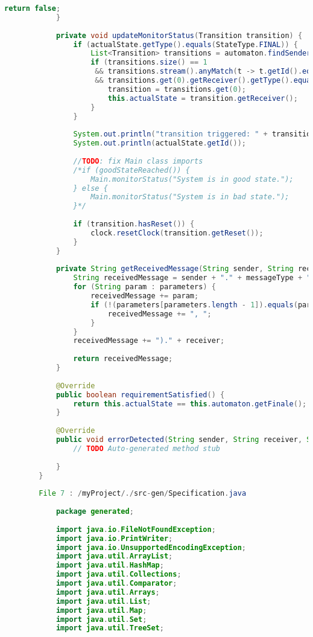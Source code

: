 \begin{lstlisting}[language=java, caption={példa unit teszteset.},captionpos=b]
				return false;
			}
			
			private void updateMonitorStatus(Transition transition) {
				if (actualState.getType().equals(StateType.FINAL)) {
					List<Transition> transitions = automaton.findSender(this.actualState);
					if (transitions.size() == 1 
					 && transitions.stream().anyMatch(t -> t.getId().equals("epsilon"))
					 && transitions.get(0).getReceiver().getType().equals(StateType.FINAL)) {
						transition = transitions.get(0);
						this.actualState = transition.getReceiver();
					}
				}
				
				System.out.println("transition triggered: " + transition.getId());
				System.out.println(actualState.getId());
				
				//TODO: fix Main class imports		
				/*if (goodStateReached()) {
					Main.monitorStatus("System is in good state.");
				} else {
					Main.monitorStatus("System is in bad state.");
				}*/
				
				if (transition.hasReset()) {
					clock.resetClock(transition.getReset());
				}
			}
			
			private String getReceivedMessage(String sender, String receiver, String messageType, String[] parameters) {
				String receivedMessage = sender + "." + messageType + "(";
				for (String param : parameters) {
					receivedMessage += param;
					if (!(parameters[parameters.length - 1]).equals(param)) {
						receivedMessage += ", ";
					}
				}
				receivedMessage += ")." + receiver;
				
				return receivedMessage;
			}
		
			@Override
			public boolean requirementSatisfied() {
				return this.actualState == this.automaton.getFinale();
			}
		
			@Override
			public void errorDetected(String sender, String receiver, String messageType, String[] parameters) {
				// TODO Auto-generated method stub
				
			}
		}
		
		File 7 : /myProject/./src-gen/Specification.java
		
			package generated;
		
			import java.io.FileNotFoundException;
			import java.io.PrintWriter;
			import java.io.UnsupportedEncodingException;
			import java.util.ArrayList;
			import java.util.HashMap;
			import java.util.Collections;
			import java.util.Comparator;
			import java.util.Arrays;
			import java.util.List;
			import java.util.Map;
			import java.util.Set;
			import java.util.TreeSet;
			

\end{lstlisting}
